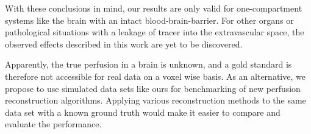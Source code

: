 \documentclass[paper=a4, fontsize=11pt,parskip=half,headings=small]{scrartcl}
\newcommand{\missingsource}{\textcolor{red}{[?]}}
\begin{document}
With these conclusions in mind, our results are only valid for one-compartment systems like the brain with an intact blood-brain-barrier. For other organs or pathological situations with a leakage of tracer into the extravascular space, the observed effects described in this work are yet to be discovered.
	 
Apparently, the true perfusion in a brain is unknown, and a gold standard is therefore not accessible for real data on a voxel wise basis. As an alternative, we propose to use simulated data sets like ours for benchmarking of new perfusion reconstruction algorithms. Applying various reconstruction methods  to the same data set with a known ground truth would make it easier to compare and evaluate the performance. 
	 
	 
%	
	
\end{document}
